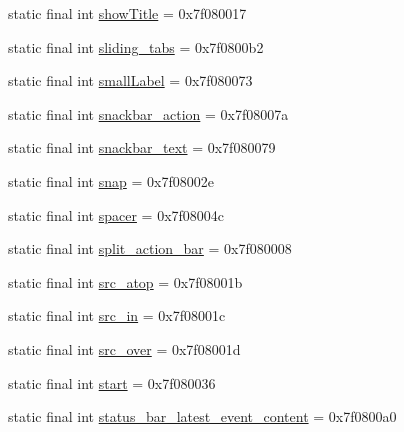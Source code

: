 \begin{CompactItemize}
\item 
static final int \hyperlink{classandroid_1_1support_1_1graphics_1_1drawable_1_1_r_1_1id_d330c20e2cbc7a69ef1009bd802fc5a7}{showTitle} = 0x7f080017
\item 
static final int \hyperlink{classandroid_1_1support_1_1graphics_1_1drawable_1_1_r_1_1id_c3a1b04e61ada814722d4cc67ed76909}{sliding\_\-tabs} = 0x7f0800b2
\item 
static final int \hyperlink{classandroid_1_1support_1_1graphics_1_1drawable_1_1_r_1_1id_fd44e0b7c5f8a08f9fd1c5082a54c4a0}{smallLabel} = 0x7f080073
\item 
static final int \hyperlink{classandroid_1_1support_1_1graphics_1_1drawable_1_1_r_1_1id_2d7713d0acf05132d4ca43daef48659f}{snackbar\_\-action} = 0x7f08007a
\item 
static final int \hyperlink{classandroid_1_1support_1_1graphics_1_1drawable_1_1_r_1_1id_3f20859208813db5159aba1528e2e6c8}{snackbar\_\-text} = 0x7f080079
\item 
static final int \hyperlink{classandroid_1_1support_1_1graphics_1_1drawable_1_1_r_1_1id_25784502867f65c1fc35eb1f047ef50d}{snap} = 0x7f08002e
\item 
static final int \hyperlink{classandroid_1_1support_1_1graphics_1_1drawable_1_1_r_1_1id_9fe8fd4eb516b1f4747abdeea48e3ddc}{spacer} = 0x7f08004c
\item 
static final int \hyperlink{classandroid_1_1support_1_1graphics_1_1drawable_1_1_r_1_1id_a41d677a767054c3f5e9ffd235509363}{split\_\-action\_\-bar} = 0x7f080008
\item 
static final int \hyperlink{classandroid_1_1support_1_1graphics_1_1drawable_1_1_r_1_1id_6e2a80c52f8071a878f8de01225e4569}{src\_\-atop} = 0x7f08001b
\item 
static final int \hyperlink{classandroid_1_1support_1_1graphics_1_1drawable_1_1_r_1_1id_4c1bcc508371d0a65d2c2eb9238f1f4c}{src\_\-in} = 0x7f08001c
\item 
static final int \hyperlink{classandroid_1_1support_1_1graphics_1_1drawable_1_1_r_1_1id_494a1c9b6f6802858a769f6c7822fc73}{src\_\-over} = 0x7f08001d
\item 
static final int \hyperlink{classandroid_1_1support_1_1graphics_1_1drawable_1_1_r_1_1id_53c1677409b02e30a953ce4712fef78d}{start} = 0x7f080036
\item 
static final int \hyperlink{classandroid_1_1support_1_1graphics_1_1drawable_1_1_r_1_1id_d48e1c72968a428927f77813097b0a4c}{status\_\-bar\_\-latest\_\-event\_\-content} = 0x7f0800a0
\item 

\end{CompactItemize}
